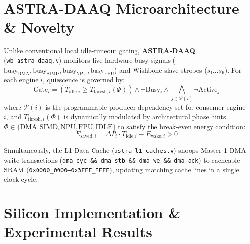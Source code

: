 \documentclass[conference]{IEEEtran}
\begin{document}
\section{ASTRA-DAAQ Microarchitecture \& Novelty}
Unlike conventional local idle-timeout gating, \textbf{ASTRA-DAAQ} (\texttt{wb\_astra\_daaq.v}) monitors live hardware busy signals ($\text{busy}_{\text{DMA}}, \text{busy}_{\text{SIMD}}, \text{busy}_{\text{NPU}}, \text{busy}_{\text{FPU}}$) and Wishbone slave strobes ($s_1\dots s_6$). For each engine $i$, quiescence is governed by:
\begin{equation}
    \text{Gate}_i = \left( T_{\text{idle}, i} \ge T_{\text{thresh}, i}(\Phi) \right) \land \neg \text{Busy}_i \land \bigwedge_{j \in \mathcal{P}(i)} \neg \text{Active}_j
\end{equation}
where $\mathcal{P}(i)$ is the programmable producer dependency set for consumer engine $i$, and $T_{\text{thresh}, i}(\Phi)$ is dynamically modulated by architectural phase hints $\Phi \in \{\text{DMA}, \text{SIMD}, \text{NPU}, \text{FPU}, \text{IDLE}\}$ to satisfy the break-even energy condition:
\begin{equation}
    E_{\text{saved}, i} = \Delta P_i \cdot T_{\text{idle}, i} - E_{\text{wake}, i} > 0
\end{equation}

Simultaneously, the L1 Data Cache (\texttt{astra\_l1\_caches.v}) snoops Master-1 DMA write transactions (\texttt{dma\_cyc \&\& dma\_stb \&\& dma\_we \&\& dma\_ack}) to cacheable SRAM (\texttt{0x0000\_0000--0x3FFF\_FFFF}), updating matching cache lines in a single clock cycle.

\section{Silicon Implementation \& Experimental Results}
\end{document}
